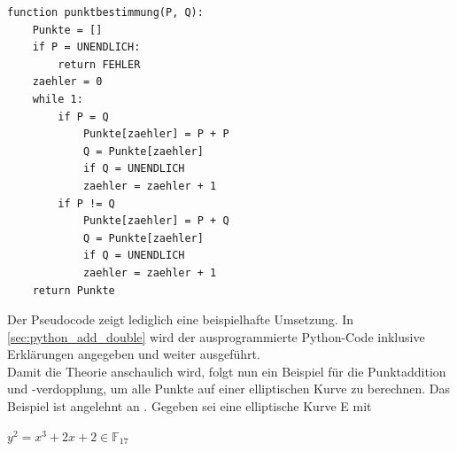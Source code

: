 \begin{lstlisting}[caption={Punktberechnung in Python}, captionpos=b]
function punktbestimmung(P, Q):
	Punkte = []	
	if P = UNENDLICH:
		return FEHLER		
	zaehler = 0
	while 1:
		if P = Q
			Punkte[zaehler] = P + P
			Q = Punkte[zaehler]
			if Q = UNENDLICH
			zaehler = zaehler + 1	
		if P != Q
			Punkte[zaehler] = P + Q
			Q = Punkte[zaehler]
			if Q = UNENDLICH
			zaehler = zaehler + 1
	return Punkte
\end{lstlisting}

Der Pseudocode zeigt lediglich eine beispielhafte Umsetzung. In \ref{sec:python_add_double} wird der ausprogrammierte Python-Code inklusive Erklärungen angegeben und weiter ausgeführt.\\

Damit die Theorie anschaulich wird, folgt nun ein Beispiel für die Punktaddition und -verdopplung, um alle Punkte auf einer elliptischen Kurve zu berechnen. Das Beispiel ist angelehnt an \cite[S. 279-280]{Paar.2016}. Gegeben sei eine elliptische Kurve E mit
\begin{center}
$y^{2} =  x^{3} + 2x + 2 \in \mathbb{F}_{17}$
\end{center}

